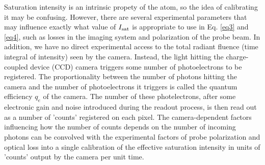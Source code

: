 Saturation intensity is an intrinsic propety of the atom, so the idea of calibrating it may be confusing. However, there are several experimental parameters that may influence exactly what value of $I_{\rm{sat}}$ is appropriate to use in Eq. \ref{eq3} and \ref{eq4}, such as losses in the imaging system and polarization of the probe beam. In addition, we have no direct experimental access to the total radiant fluence (time integral of intensity) seen by the camera. Instead, the light hitting the charge-coupled device (CCD) camera triggers some number of photoelectrons to be registered. The proportionality between the number of photons hitting the camera and the number of photoelectrons it triggers is called the quantum efficiency $q_e$ of the camera. The number of these photelectrons, after some electronic gain and noise introduced during the readout process, is then read out as a number of 'counts' registered on each pixel. The camera-dependent factors influencing how the number of counts depends on the number of incoming photons can be convolved with the experimental factors of probe polarization and optical loss into a single calibration of the effective saturation intensity in units of  'counts' output by the camera per unit time. 

